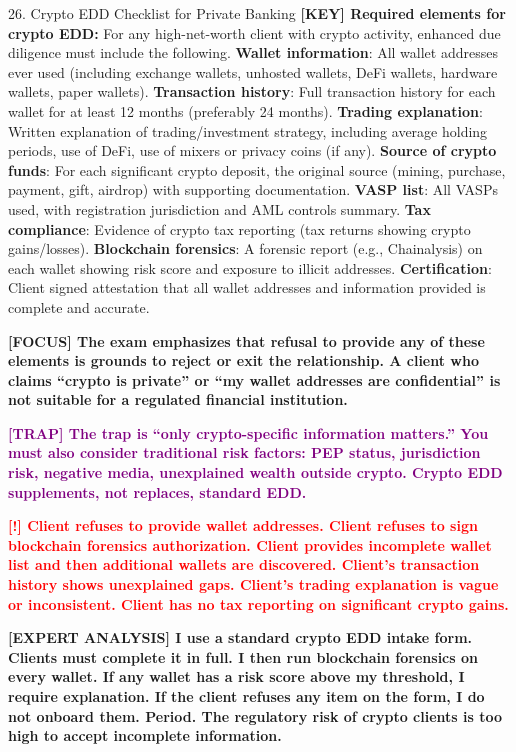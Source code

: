 \documentclass[11pt,a4paper]{beamer}
\newcommand{\redflag}[1]{\textcolor{red}{\textbf{[!] #1}}}
\newcommand{\examfocus}[1]{\textcolor{orange!80!black}{\textbf{[FOCUS] #1}}}
\newcommand{\trap}[1]{\textcolor{purple}{\textbf{[TRAP] #1}}}
\newcommand{\keyterm}[1]{\textcolor{red!80!black}{\textbf{[KEY] #1}}}
\newcommand{\expert}[1]{\textcolor{blue!70!black}{\textbf{[EXPERT ANALYSIS] #1}}}
\begin{document}
	\begin{frame}{26. Crypto EDD Checklist for Private Banking}
		\tiny
		\keyterm{Required elements for crypto EDD:} For any high-net-worth client with crypto activity, enhanced due diligence must include the following. \textbf{Wallet information}: All wallet addresses ever used (including exchange wallets, unhosted wallets, DeFi wallets, hardware wallets, paper wallets). \textbf{Transaction history}: Full transaction history for each wallet for at least 12 months (preferably 24 months). \textbf{Trading explanation}: Written explanation of trading/investment strategy, including average holding periods, use of DeFi, use of mixers or privacy coins (if any). \textbf{Source of crypto funds}: For each significant crypto deposit, the original source (mining, purchase, payment, gift, airdrop) with supporting documentation. \textbf{VASP list}: All VASPs used, with registration jurisdiction and AML controls summary. \textbf{Tax compliance}: Evidence of crypto tax reporting (tax returns showing crypto gains/losses). \textbf{Blockchain forensics}: A forensic report (e.g., Chainalysis) on each wallet showing risk score and exposure to illicit addresses. \textbf{Certification}: Client signed attestation that all wallet addresses and information provided is complete and accurate.
		
		\vspace{0.1cm}
		\examfocus{The exam emphasizes that refusal to provide any of these elements is grounds to reject or exit the relationship. A client who claims “crypto is private” or “my wallet addresses are confidential” is not suitable for a regulated financial institution.}
		
		\vspace{0.1cm}
		\trap{The trap is “only crypto-specific information matters.” You must also consider traditional risk factors: PEP status, jurisdiction risk, negative media, unexplained wealth outside crypto. Crypto EDD supplements, not replaces, standard EDD.}
		
		\vspace{0.1cm}
		\redflag{Client refuses to provide wallet addresses. Client refuses to sign blockchain forensics authorization. Client provides incomplete wallet list and then additional wallets are discovered. Client's transaction history shows unexplained gaps. Client's trading explanation is vague or inconsistent. Client has no tax reporting on significant crypto gains.}
		
		\vspace{0.1cm}
		\expert{I use a standard crypto EDD intake form. Clients must complete it in full. I then run blockchain forensics on every wallet. If any wallet has a risk score above my threshold, I require explanation. If the client refuses any item on the form, I do not onboard them. Period. The regulatory risk of crypto clients is too high to accept incomplete information.}
	\end{frame}
	
\end{document}
